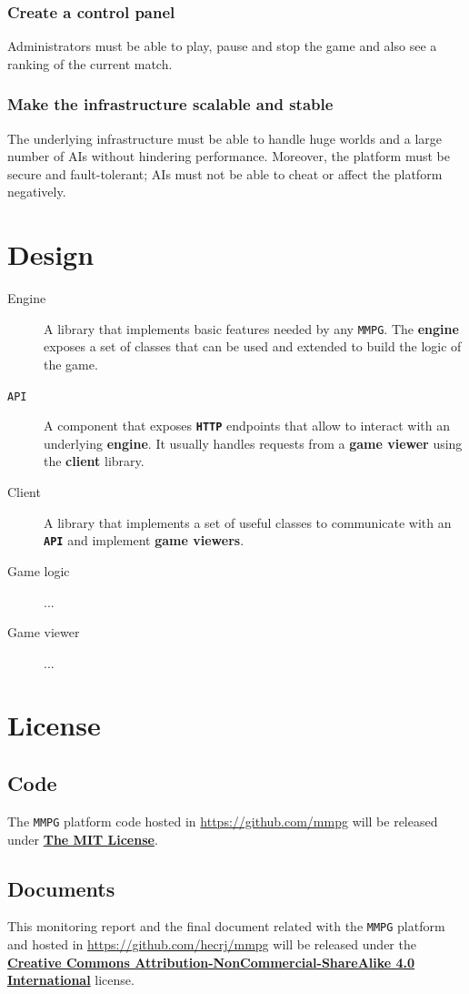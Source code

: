 \documentclass[a4paper,11pt,titlepage,abstract,numbers=noenddot,automark,mnsy,intlimits,rgb,dvipsnames]{report}
\begin{document}
\subsection{Create a control panel}
Administrators must be able to play, pause and stop the game and also see a ranking of the current match.
\subsection{Make the infrastructure scalable and stable}
The underlying infrastructure must be able to handle huge worlds and a large number of \texttt{}AI\texttt{}s without
hindering performance. Moreover, the platform must be secure and fault-tolerant; AIs must not be able to cheat
or affect the platform negatively.
\clearpage
\chapter{Design}
\begin{description}
\item[Engine]
A library that implements basic features needed by any \texttt{MMPG}. The \textbf{engine} exposes a set
  of classes that can be used and extended to build the logic of the game.
\item[\texttt{API}]
A component that exposes \textbf{\texttt{HTTP}} endpoints that allow to interact with an underlying \textbf{engine}. It
  usually handles requests from a \textbf{game viewer} using the \textbf{client} library.
\item[Client]
A library that implements a set of useful classes to communicate with an \textbf{\texttt{API}} and implement
  \textbf{game viewers}.
\item[Game logic]
...
\item[Game viewer]
...
\end{description}
\clearpage
\chapter{License}
\section{Code}
The \texttt{MMPG} platform code hosted in \url{https://github.com/mmpg} will be released under
\href{https://opensource.org/licenses/MIT}{\textbf{The MIT License}}.
\section{Documents}
This monitoring report and the final document related with the \texttt{MMPG} platform and hosted in
\url{https://github.com/hecrj/mmpg} will be released under the
\href{http://creativecommons.org/licenses/by-nc-sa/4.0/legalcode.txt}{\textbf{Creative Commons Attribution-NonCommercial-ShareAlike 4.0 International}}
license.
\clearpage
\end{document}
